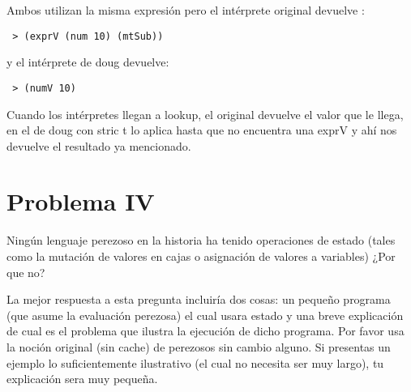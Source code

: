 \documentclass[12pt]{article}
\begin{document}
Ambos utilizan la misma expresión pero el intérprete original devuelve :
\begin{verbatim}
 > (exprV (num 10) (mtSub))
 \end{verbatim}
y el intérprete de doug devuelve:
\begin{verbatim}
 > (numV 10)
 \end{verbatim} 
Cuando los intérpretes llegan a lookup, el original devuelve el valor que le llega, en el de doug con stric t lo aplica hasta que no encuentra una exprV y ahí nos devuelve el resultado ya mencionado.


\section*{Problema IV}
Ningún lenguaje perezoso en la historia ha tenido operaciones de estado (tales
como la mutación de valores en cajas o asignación de valores a variables) ¿Por
que no?

La mejor respuesta a esta pregunta incluiría dos cosas: un pequeño programa (que
asume la evaluación perezosa) el cual usara estado y una breve explicación de cual
es el problema que ilustra la ejecución de dicho programa. Por favor usa la
noción original (sin cache) de perezosos sin cambio alguno. Si presentas un
ejemplo lo suficientemente ilustrativo (el cual no necesita ser muy largo), tu
explicación sera muy pequeña.
\end{document}
